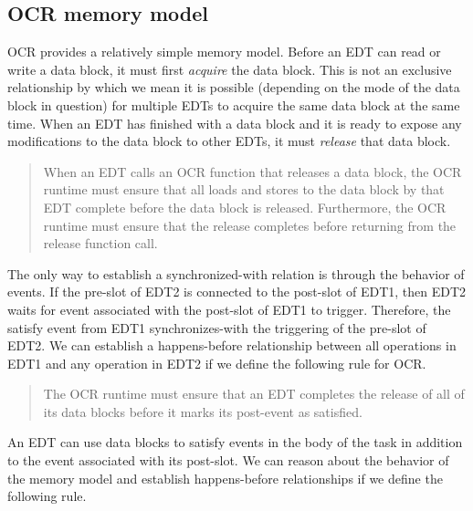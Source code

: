 \subsection{OCR memory model}
OCR provides a relatively simple memory model. Before an EDT can read
or write a data block, it must first \emph{acquire} the data
block. This is not an exclusive relationship by which we mean it is
possible (depending on the mode of the data block in question) for
multiple EDTs to acquire the same data block at the same
time. When an EDT has finished with a data block and it is ready
to expose any modifications to the data block to other EDTs, it
must \emph{release} that data block.

\begin{quote}
When an EDT calls an OCR function that releases a data block, the OCR
runtime must ensure that all loads and stores to the data block by that
EDT complete before the data block is released. Furthermore, the OCR
runtime must ensure that the release completes before returning
from the release function call.
\end{quote}

The only way to establish a synchronized-with relation is through the
behavior of events. If the pre-slot of EDT2 is connected to the post-slot
of EDT1, then EDT2 waits for event associated with the post-slot of EDT1 to
trigger. Therefore, the satisfy event from EDT1 synchronizes-with the
triggering of the pre-slot of EDT2. We can establish a happens-before
relationship between all operations in EDT1 and any operation in EDT2
if we define the following rule for OCR.

\begin{quote}
The OCR runtime must ensure that an EDT completes the release of all
of its data blocks before it marks its post-event as satisfied.
\end{quote}

An EDT can use data blocks to satisfy events in the body of the task
in addition to the event associated with its post-slot. We can reason
about the behavior of the memory model and establish happens-before
relationships if we define the following rule.


